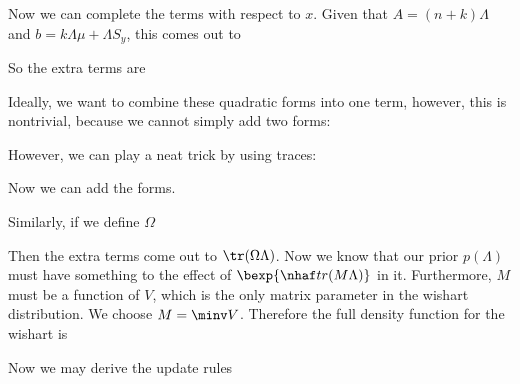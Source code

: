 \documentclass[12pt]{article}
\begin{document}
Now we can complete the terms with respect to $x$. Given that $A = (n+k)\Lambda$ and $b = k\Lambda \mu + \Lambda S_y$, this comes out to


So the extra terms are

Ideally, we want to combine these quadratic forms into one term, however, this is nontrivial, because we cannot simply add two forms:


However, we can play a neat trick by using traces:


Now we can add the forms.


Similarly, if we define $\Omega$


Then the extra terms come out to $\tr(\Omega \Lambda)$. Now we know that our prior $p(\Lambda)$ must have something to the effect of $\bexp{\nhaf tr(M\Lambda)}$ in it. Furthermore, $M$ must be a function of $V$, which is the only matrix parameter in the wishart distribution. We choose $M = \minv V$. Therefore the full density function for the wishart is


Now we may derive the update rules

\end{document}
